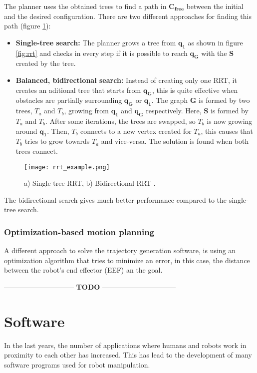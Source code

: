 The planner uses the obtained trees to find a path in $\bm{C_{free}}$ between the initial and the desired configuration. There are two different approaches for finding this path (figure \ref{fig:rrt_ex}):
\begin{itemize}
	\item \textbf{Single-tree search:} The planner grows a tree from $\bm{q_1}$ as shown in figure \ref{fig:rrt} and checks in every step if it is possible to reach $\bm{q_G}$ with the $\bm{S}$ created by the tree.
	\item \textbf{Balanced, bidirectional search:} Instead of creating only one RRT, it creates an aditional tree that starts from $\bm{q_G}$, this is quite effective when obstacles are partially surrounding $\bm{q_G}$ or $\bm{q_1}$. The graph $\bm{G}$ is formed by two trees, $T_a$ and $T_b$, growing from $\bm{q_1}$ and $\bm{q_G}$ respectively. Here, $\bm{S}$ is formed by $T_a$ and $T_b$. After some iterations, the trees are swapped, so $T_b$ is now growing around $\bm{q_1}$. Then, $T_b$ connects to a new vertex created for $T_a$, this causes that $T_b$ tries to grow towards $T_a$ and vice-versa. The solution is found when both trees connect.
\end{itemize}

\begin{figure}[H]
	\centering
	\texttt{[image: rrt\_example.png]}
	\vspace{-10pt}
	\caption{ a) Single tree RRT, b) Bidirectional RRT \citep[chap.5, page 219]{planning}.}
	\vspace{-15pt}
	\label{fig:rrt_ex}
\end{figure}

The bidirectional search gives much better performance compared to the single-tree search.

\subsubsection{Optimization-based motion planning}
 A different approach to solve the trajectory generation software, is using an optimization algorithm that tries to minimize an error, in this case, the distance between the robot's end effector (EEF) an the goal.

------------------------------ \textbf{TODO} --------------------------------



\section{Software}
In the last years, the number of applications where humans and robots work in proximity to each other has increased. This has lead to the development of many software programs used for robot manipulation. 

